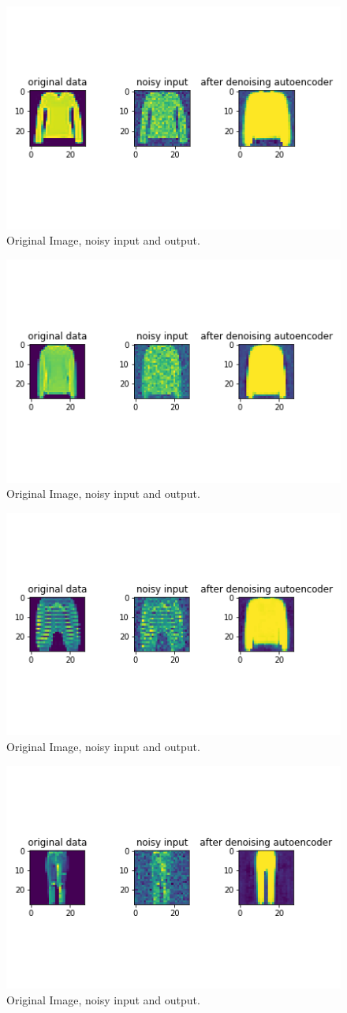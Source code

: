 \documentclass[11pt,a4paper,oneside]{article}
\begin{document}
\begin{figure}[!btp]
	\centering
	\includegraphics[width=.6\textwidth]{figures/save_ev_de_5}
	\caption{Original Image, noisy input and output.}
\end{figure}
\begin{figure}[!btp]
	\centering
	\includegraphics[width=.6\textwidth]{figures/save_ev_de_6}
	\caption{Original Image, noisy input and output.}
\end{figure}
\begin{figure}[!btp]
	\centering
	\includegraphics[width=.6\textwidth]{figures/save_ev_de_7}
	\caption{Original Image, noisy input and output.}
\end{figure}
\begin{figure}[!btp]
	\centering
	\includegraphics[width=.6\textwidth]{figures/save_ev_de_8}
	\caption{Original Image, noisy input and output.}
\end{figure}
\end{document}
